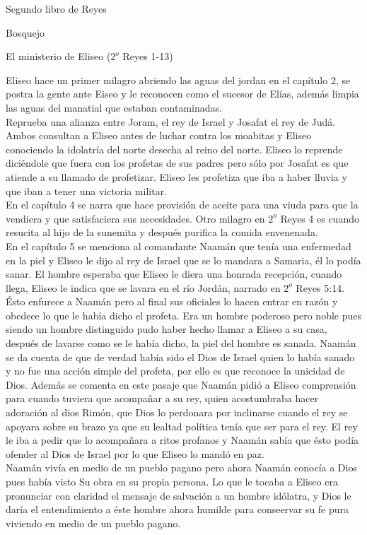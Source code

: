 \begin{section}{Segundo libro de Reyes}
\begin{subsection}{Bosquejo}
\begin{subsubsection}{El ministerio de Eliseo ($2^{o}$ Reyes 1-13)}
\begin{enumerate}
					Eliseo hace un primer milagro abriendo las aguas del jordan en el capítulo 2, se postra la gente ante Eiseo y le reconocen como el sucesor de Elías, además limpia las aguas del manatial que estaban contaminadas.\\
					Reprueba una alianza entre Joram, el rey de Israel y Josafat el rey de Judá. Ambos consultan a Eliseo antes de luchar contra los moabitas y Eliseo conociendo la idolatría del norte desecha al reino del norte. Eliseo lo reprende diciéndole que fuera con los profetas de sus padres pero sólo por Josafat es que atiende a su llamado de profetizar. Eliseo les profetiza que iba a haber lluvia y que iban a tener una victoria militar.\\
					En el capítulo 4 se narra que hace provisión de aceite para una viuda para que la vendiera y que satisfaciera sus necesidades. Otro milagro en $2^{o}$ Reyes 4 es cuando resucita al hijo de la sunemita y después purifica la comida envenenada.\\
					En el capítulo 5 se menciona al comandante Naamán que tenía una enfermedad en la piel y Eliseo le dijo al rey de Israel que se lo mandara a Samaria, él lo podía sanar.
					\newpage
					El hombre esperaba que Eliseo le diera una honrada recepción, cuando llega, Eliseo le indica que se lavara en el río Jordán, narrado en $2^{o}$ Reyes 5:14. Ésto enfurece a Naamán pero al final sus oficiales lo hacen entrar en razón y obedece lo que le había dicho el profeta. Era un hombre poderoso pero noble pues siendo un hombre distinguido pudo haber hecho llamar a Eliseo a su casa, después de lavarse como se le había dicho, la piel del hombre es sanada. Naamán se da cuenta de que de verdad había sido el Dios de Israel quien lo había sanado y no fue una acción simple del profeta, por ello es que reconoce la unicidad de Dios. Además se comenta en este pasaje que Naamán pidió a Eliseo comprensión para cuando tuviera que acompañar a su rey, quien acostumbraba hacer adoración al dios Rimón, que Dios lo perdonara por inclinarse cuando el rey se apoyara sobre su brazo ya que su lealtad política tenía que ser para el rey. El rey le iba a pedir que lo acompañara a ritos profanos y Naamán sabía que ésto podía ofender al Dios de Israel por lo que Eliseo lo mandó en paz.\\
					Naamán vivía en medio de un pueblo pagano pero ahora Naamán conocía a Dios pues había visto Su obra en su propia persona. Lo que le tocaba a Eliseo era pronunciar con claridad el mensaje de salvación a un hombre idólatra, y Dios le daría el entendimiento a éste hombre ahora humilde para conseervar su fe pura viviendo en medio de un pueblo pagano.\\

\end{enumerate}
\end{subsubsection}
\end{subsection}
\end{section}
